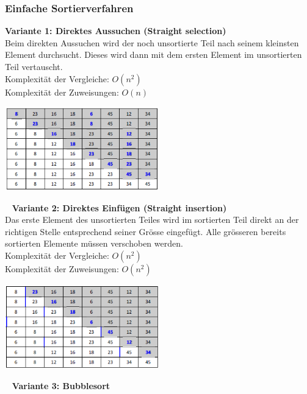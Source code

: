 \subsubsection{Einfache Sortierverfahren}
\textbf{Variante 1: Direktes Aussuchen (Straight selection)}\\
Beim direkten Aussuchen wird der noch unsortierte Teil nach seinem kleinsten Element durchsucht. Dieses wird dann mit dem ersten Element im unsortierten Teil vertauscht.\\
Komplexität der Vergleiche: $O(n^2)$\\
Komplexität der Zuweisungen: $O(n)$\\
\begin{multicols}{2}

\includegraphics[width=0.5\textwidth]{images/Algorithmen/DirektesAussuchen.png}
\end{multicols}
\ \newpage
\textbf{Variante 2: Direktes Einfügen (Straight insertion)}\\
Das erste Element des unsortierten Teiles wird im sortierten Teil direkt an der richtigen Stelle entsprechend seiner Grösse eingefügt. Alle grösseren bereits sortierten Elemente müssen verschoben werden.\\
Komplexität der Vergleiche: $O(n^2)$\\
Komplexität der Zuweisungen: $O(n^2)$\\
\begin{multicols}{2}

\includegraphics[width=0.5\textwidth]{images/Algorithmen/DirektesEinfuegen.png}
\end{multicols}
\ \newline
\textbf{Variante 3: Bubblesort}\\
